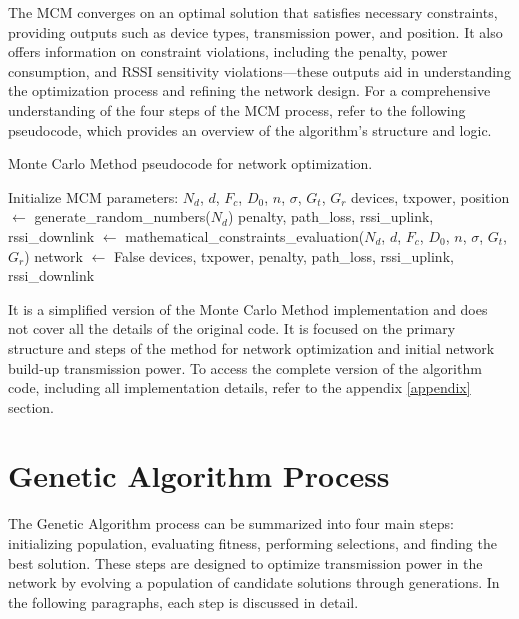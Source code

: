 The MCM converges on an optimal solution that satisfies necessary constraints, providing outputs such as device types, transmission power, and position. It also offers information on constraint violations, including the penalty, power consumption, and RSSI sensitivity violations—these outputs aid in understanding the optimization process and refining the network design. For a comprehensive understanding of the four steps of the MCM process, refer to the following pseudocode, which provides an overview of the algorithm's structure and logic.

\begin{algorithm}[H]
    \caption{Monte Carlo Method pseudocode for network optimization.}
    \label{alg:mcm}
    \begin{algorithmic}
    \STATE Initialize MCM parameters: $N_d$, $d$, $F_c$, $D_0$, $n$, $\sigma$, $G_t$, $G_r$
        \STATE devices, txpower, position $\gets$ generate\_random\_numbers($N_d$)
        \STATE penalty, path\_loss, rssi\_uplink, rssi\_downlink $\gets$ mathematical\_constraints\_evaluation($N_d$, $d$, $F_c$, $D_0$, $n$, $\sigma$, $G_t$, $G_r$)
            \STATE network $\gets$ False
        \ENDIF
        \RETURN devices, txpower, penalty, path\_loss, rssi\_uplink, rssi\_downlink
    \ENDWHILE
    \end{algorithmic}
\end{algorithm}

It is a simplified version of the Monte Carlo Method implementation and does not cover all the details of the original code. It is focused on the primary structure and steps of the method for network optimization and initial network build-up transmission power. To access the complete version of the algorithm code, including all implementation details, refer to the appendix \ref{appendix} section.

\section{Genetic Algorithm Process}\label{sec:genetic_algorithm}

The Genetic Algorithm process can be summarized into four main steps: initializing population, evaluating fitness, performing selections, and finding the best solution. These steps are designed to optimize transmission power in the network by evolving a population of candidate solutions through generations. In the following paragraphs, each step is discussed in detail.

